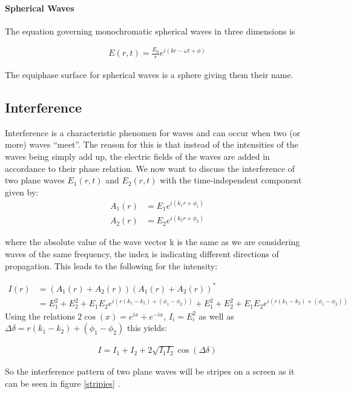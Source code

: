\paragraph{Spherical Waves}

The equation governing monochromatic spherical waves in three dimensions is

\begin{align}
E(r, t) = \frac{E_0}{r}e^{i(kr-\omega t+\phi)}
\end{align}

The equiphase surface for spherical waves is a sphere giving them their name.
\subsection{Interference \label{Interference}}

Interference is a characteristic phenomen for waves and can occur when two (or more) waves ``meet''. The reason for this is that instead of the intensities of the waves being simply add up, the electric fields of the waves are added in accordance to their phase relation. We now want to discuss the interference of two plane waves $E_1(r, t)$ and $E_2(r, t)$ with the time-independent component given by:
\begin{align}
A_1(r) &= E_1 e^{i(k_1r+\phi_1)}\\
A_2(r) &= E_2 e^{i(k_2r+\phi_2)}
\end{align}

where the absolute value of the wave vector k is the same as we are considering waves of the same frequency, the index is indicating different directions of propagation. This leads to the following for the intensity:

\begin{align*}
I(r )&=\left( A_1(r) + A_2(r)\right) \left( A_1(r) + A_2(r)\right) ^*\\
     &= E_1^2 + E_2^2 + E_1E_2e^{i(r(k_1-k_2)+(\phi_1-\phi_2))} +  E_1^2 + E_2^2 + E_1E_2e^{i(r(k_1-k_2)+(\phi_1-\phi_2))}
\end{align*}
Using the relations $2\cos(x) = e^{ix} + e^{-ix}$, $I_i=E_i^2$ as well as $\Delta \delta = r(k_1 - k_2) +(\phi_1-\phi_2)$ this yields:

\begin{align}
I=I_1+I_2 +2 \sqrt{I_1I_2}\cos(\Delta \delta) \label{Intensity}
\end{align}

So the interference pattern of two plane waves will be stripes on a screen as it can be seen in figure \ref{stripies} . \cite{staats}

